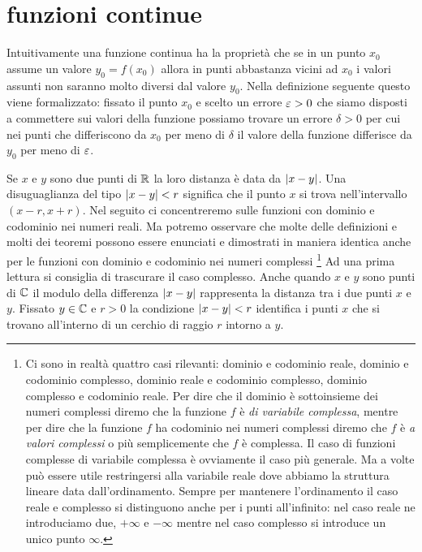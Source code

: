 \section{funzioni continue}
\label{sec:continuita}

Intuitivamente una funzione continua ha la proprietà
che se in un punto $x_0$ assume un valore $y_0=f(x_0)$ allora
in punti abbastanza vicini ad $x_0$ i valori assunti
non saranno molto diversi dal valore $y_0$.
Nella definizione seguente questo viene formalizzato:
fissato il punto $x_0$ e scelto un errore $\varepsilon>0$
che siamo disposti a commettere sui valori della funzione
possiamo trovare un errore $\delta>0$ per cui nei punti
che differiscono da $x_0$ per meno di $\delta$ il valore
della funzione differisce da $y_0$ per meno di $\varepsilon$.

Se $x$ e $y$ sono due punti di ${\mathbb R}$ la loro distanza 
è data da ${\left|x-y\right|}$. 
Una disuguaglianza del tipo ${\left|x-y\right|}<r$ significa 
che il punto $x$ si trova nell'intervallo $(x-r,x+r)$.
Nel seguito ci concentreremo sulle funzioni con dominio 
e codominio nei numeri reali. 
Ma potremo osservare che molte delle definizioni e molti 
dei teoremi possono essere enunciati e dimostrati in maniera 
identica anche per le funzioni con dominio e codominio 
nei numeri complessi%
\footnote{Ci sono in realtà quattro casi rilevanti:
dominio e codominio reale, dominio e codominio complesso, 
dominio reale e codominio complesso, 
dominio complesso e codominio reale. 
Per dire che il dominio è sottoinsieme dei numeri complessi 
diremo che la funzione $f$ è \emph{di variabile complessa},
mentre per dire che la funzione $f$ ha codominio nei numeri 
complessi diremo che $f$ è \emph{a valori complessi}
o più semplicemente che $f$ è complessa.
Il caso di funzioni complesse di variabile complessa 
è ovviamente il caso più generale. 
Ma a volte può essere utile restringersi alla variabile 
reale dove abbiamo la struttura lineare data dall'ordinamento.
Sempre per mantenere l'ordinamento il caso reale e complesso 
si distinguono anche per i punti all'infinito: nel caso reale 
ne introduciamo due, $+\infty$ e $-\infty$ mentre nel caso 
complesso si introduce un unico punto $\infty$.
} 
Ad una prima lettura si consiglia di trascurare 
il caso complesso.
Anche quando $x$ e $y$ sono punti di ${\mathbb C}$ il modulo della 
differenza ${\left|x-y\right|}$ rappresenta la distanza tra i due 
punti $x$ e $y$. 
Fissato $y\in {\mathbb C}$ e $r>0$
la condizione ${\left|x-y\right|}<r$ identifica i punti $x$ 
che si trovano all'interno di un cerchio di raggio $r$
intorno a $y$.

